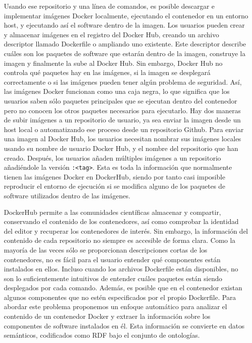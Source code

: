 Usando ese repositorio y una línea de comandos, es posible descargar e implementar imágenes Docker localmente, ejecutando el contenedor en un entorno host, y ejecutando así el software dentro de la imagen. Los usuarios pueden crear y almacenar imágenes en el registro del Docker Hub, creando un archivo descriptor llamado Dockerfile o ampliando uno existente.  Este descriptor describe cuáles son los paquetes de software que estarán dentro de la imagen, construye la imagen y finalmente la sube al Docker Hub. Sin embargo, Docker Hub no controla qué paquetes hay en las imágenes, si la imagen se desplegará correctamente o si las imágenes pueden tener algún problema de seguridad. 
Así, las imágenes Docker funcionan como una caja negra, lo que significa que los usuarios saben sólo paquetes principales que se ejecutan dentro del contenedor pero no conocen los otros paquetes necesarios para ejecutarlo.
Hay dos maneras de subir imágenes a un repositorio de usuario, ya sea enviar la imagen desde un host local o automatizando ese proceso desde un repositorio Github. Para enviar una imagen al Docker Hub, los usuarios necesitan nombrar sus imágenes locales usando su nombre de usuario Docker Hub, y el nombre del repositorio que han creado. Después, los usuarios añaden múltiples imágenes a un repositorio añadiéndole la versión \texttt{:<tag>}. Esta es toda la información que normalmente tienen las imágenes Docker en DockerHub, siendo por tanto casi imposible reproducir el entorno de ejecución si se modifica alguno de los paquetes de software utilizados dentro de las imágenes. 
 
 
DockerHub permite a las comunidades científicas almacenar y compartir, conservando el contenido de los contenedores, así como comprobar la identidad del editor y recuperar los contenedores de interés. Sin embargo, la información del contenido de cada repositorio no siempre es accesible de forma clara. 
Como la mayoría de las veces sólo se proporcionan descripciones cortas de los contenedores, no es fácil para el usuario entender qué componentes están instalados en ellos. 
Incluso cuando los archivos Dockerfile están disponibles, no son lo suficientemente intuitivos de entender cuáles paquetes están siendo desplegados por cada comando.
Además, es posible que en el contenedor existan algunos componentes que no estén especificados por el propio Dockerfile. Para abordar este problema proponemos un enfoque automático para analizar el contenido de un contenedor Docker y extraer la información sobre los componentes de software instalados en él. Esta información se convierte en datos semánticos, codificados como RDF bajo el conjunto de ontologías.

